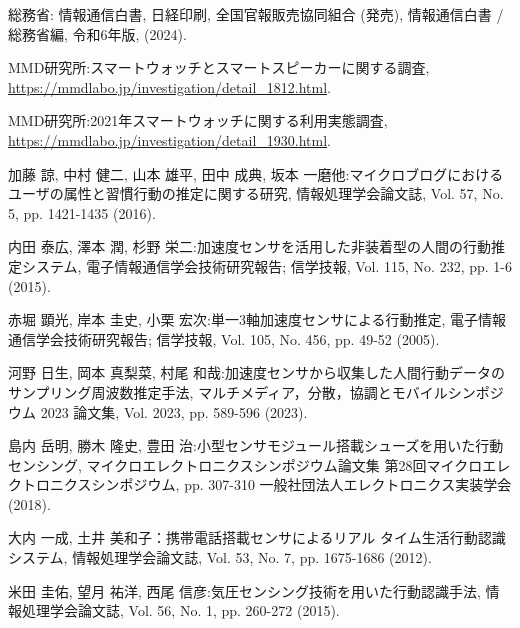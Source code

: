 \thispagestyle{myheadings}
    
\begin{thebibliography}{参考文献}

	総務省: 情報通信白書, 日経印刷, 全国官報販売協同組合 (発売), 情報通信白書 / 総務省編, 令和6年版, (2024).


	MMD研究所:スマートウォッチとスマートスピーカーに関する調査, \url{https://mmdlabo.jp/investigation/detail_1812.html}.

	MMD研究所:2021年スマートウォッチに関する利用実態調査, \url{https://mmdlabo.jp/investigation/detail_1930.html}.
	

	加藤 諒, 中村 健二, 山本 雄平, 田中 成典, 坂本 一磨他:マイクロブログにおけるユーザの属性と習慣行動の推定に関する研究, 情報処理学会論文誌, Vol. 57, No. 5, pp. 1421-1435 (2016).

	内田 泰広, 澤本 潤, 杉野 栄二:加速度センサを活用した非装着型の人間の行動推定システム, 電子情報通信学会技術研究報告; 信学技報, Vol. 115, No. 232, pp. 1-6 (2015).

	赤堀 顕光, 岸本 圭史, 小栗 宏次:単一3軸加速度センサによる行動推定, 電子情報通信学会技術研究報告; 信学技報, Vol. 105, No. 456, pp. 49-52 (2005).

	河野 日生, 岡本 真梨菜, 村尾 和哉:加速度センサから収集した人間行動データのサンプリング周波数推定手法, マルチメディア，分散，協調とモバイルシンポジウム 2023 論文集, Vol. 2023, pp. 589-596 (2023).

	島内 岳明, 勝木 隆史, 豊田 治:小型センサモジュール搭載シューズを用いた行動センシング, マイクロエレクトロニクスシンポジウム論文集 第28回マイクロエレクトロニクスシンポジウム, pp. 307-310 一般社団法人エレクトロニクス実装学会 (2018).

	大内 一成, 土井 美和子：携帯電話搭載センサによるリアル
	タイム生活行動認識システム, 情報処理学会論文誌, Vol. 53,
	No. 7, pp. 1675-1686 (2012).

	米田 圭佑, 望月 祐洋, 西尾 信彦:気圧センシング技術を用いた行動認識手法, 情報処理学会論文誌, Vol. 56, No. 1, pp. 260-272 (2015).


\end{thebibliography}
